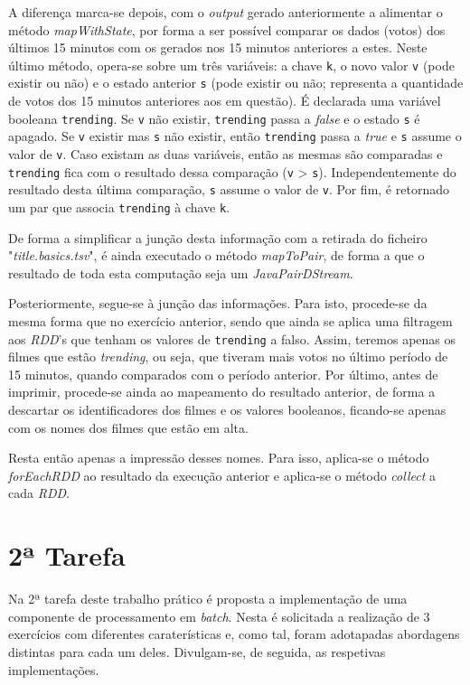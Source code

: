 \documentclass[a4paper]{report}
\begin{document}
            A diferença marca-se depois, com o \textit{output} gerado anteriormente a alimentar o método \textit{mapWithState}, por forma a ser possível comparar os dados (votos) dos últimos 15 minutos com os gerados nos 15 minutos anteriores a estes.
            Neste último método, opera-se sobre um três variáveis: a chave \texttt{k}, o novo valor \texttt{v} (pode existir ou não) e o estado anterior \texttt{s} (pode existir ou não; representa a quantidade de votos dos 15 minutos anteriores aos em questão). 
            É declarada uma variável booleana \texttt{trending}. Se \texttt{v} não existir, \texttt{trending} passa a \textit{false} e o estado \texttt{s} é apagado. 
            Se \texttt{v} existir mas \texttt{s} não existir, então \texttt{trending} passa a \textit{true} e \texttt{s} assume o valor de \texttt{v}.
            Caso existam as duas variáveis, então as mesmas são comparadas e \texttt{trending} fica com o resultado dessa comparação (\texttt{v} > \texttt{s}). 
            Independentemente do resultado desta última comparação, \texttt{s} assume o valor de \texttt{v}.
            Por fim, é retornado um par que associa \texttt{trending} à chave \texttt{k}.

            De forma a simplificar a junção desta informação com a retirada do ficheiro "\textsl{title.basics.tsv}", é ainda executado o método \textit{mapToPair}, de forma a que o resultado de toda esta computação seja um \textit{JavaPairDStream}.

            Posteriormente, segue-se à junção das informações. Para isto, procede-se da mesma forma que no exercício anterior, sendo que ainda se aplica uma filtragem aos \textit{RDD}'s que tenham os valores de \texttt{trending} a falso.
            Assim, teremos apenas os filmes que estão \textit{trending}, ou seja, que tiveram mais votos no último período de 15 minutos, quando comparados com o período anterior.
            Por último, antes de imprimir, procede-se ainda ao mapeamento do resultado anterior, de forma a descartar os identificadores dos filmes e os valores booleanos, ficando-se apenas com os nomes dos filmes que estão em alta.

            Resta então apenas a impressão desses nomes. Para isso, aplica-se o método \textit{forEachRDD} ao resultado da execução anterior e aplica-se o método \textit{collect} a cada \textit{RDD}.


    \section{2ª Tarefa} \label{sec:Task2}
        Na 2ª tarefa deste trabalho prático é proposta a implementação de uma componente de processamento em \textit{batch}. Nesta é solicitada a realização de 3 exercícios com diferentes caraterísticas e, como tal, foram adotapadas abordagens distintas para cada um deles.
        Divulgam-se, de seguida, as respetivas implementações.
\end{document}
